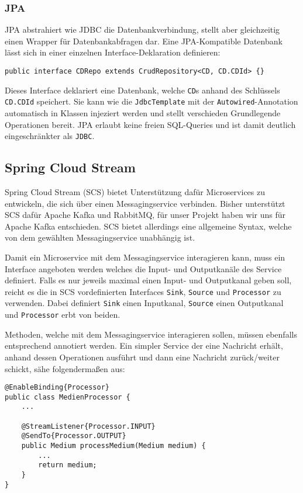 \documentclass{article}
\begin{document}
\subsubsection{JPA}

JPA abstrahiert wie JDBC die Datenbankverbindung, stellt aber gleichzeitig einen Wrapper für Datenbankabfragen dar. Eine JPA-Kompatible Datenbank lässt sich in einer einzelnen Interface-Deklaration definieren:

\begin{lstlisting}
public interface CDRepo extends CrudRepository<CD, CD.CDId> {}
\end{lstlisting}

Dieses Interface deklariert eine Datenbank, welche \texttt{CD}s anhand des Schlüssels \texttt{CD.CDId} speichert.
Sie kann wie die \texttt{JdbcTemplate} mit der \texttt{Autowired}-Annotation automatisch in Klassen injeziert werden und stellt verschieden Grundlegende Operationen bereit.
JPA erlaubt keine freien SQL-Queries und ist damit deutlich eingeschränkter als \texttt{JDBC}.

\subsection{Spring Cloud Stream}

Spring Cloud Stream (SCS) bietet Unterstützung dafür Microservices zu entwickeln, die sich über einen Messagingservice verbinden.
Bisher unterstützt SCS dafür Apache Kafka und RabbitMQ, für unser Projekt haben wir uns für Apache Kafka entschieden.
SCS bietet allerdings eine allgemeine Syntax, welche von dem gewählten Messagingservice unabhängig ist.

Damit ein Microservice mit dem Messagingservice interagieren kann, muss ein Interface angeboten werden welches die Input- und Outputkanäle des Service definiert.
Falls es nur jeweils maximal einen Input- und Outputkanal geben soll, reicht es die in SCS vordefinierten Interfaces \texttt{Sink}, \texttt{Source} und \texttt{Processor} zu verwenden.
Dabei definiert \texttt{Sink} einen Inputkanal, \texttt{Source} einen Outputkanal und \texttt{Processor} erbt von beiden.

Methoden, welche mit dem Messagingservice interagieren sollen, müssen ebenfalls entsprechend annotiert werden.
Ein simpler Service der eine Nachricht erhält, anhand dessen Operationen ausführt und dann eine Nachricht zurück/weiter schickt, sähe folgendermaßen aus:
\begin{lstlisting}
@EnableBinding{Processor}
public class MedienProcessor {
    ...

    @StreamListener{Processor.INPUT}
    @SendTo{Processor.OUTPUT}
    public Medium processMedium(Medium medium) {
        ...
        return medium;
    }
}
\end{lstlisting}
\end{document}
